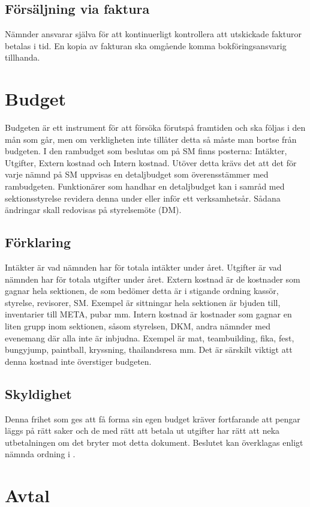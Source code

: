 \documentclass{dgovdoc}
\begin{document}
\subsection{Försäljning via faktura}
Nämnder ansvarar själva för att kontinuerligt kontrollera att utskickade fakturor betalas i tid. En kopia av
fakturan ska omgående komma bokföringsansvarig tillhanda.

\section{Budget}
Budgeten är ett instrument för att försöka förutspå framtiden och ska följas i den mån som går, men om verkligheten inte tillåter detta så måste man bortse från budgeten. I den rambudget som beslutas om på SM finns posterna: Intäkter, Utgifter, Extern kostnad och Intern kostnad. Utöver detta krävs det att det för varje nämnd på SM uppvisas en detaljbudget som överensstämmer med rambudgeten. Funktionärer som handhar en detaljbudget kan i samråd med sektionsstyrelse revidera denna under eller inför ett verksamhetsår. Sådana ändringar skall redovisas på styrelsemöte (DM).

\subsection{Förklaring}
Intäkter är vad nämnden har för totala intäkter under året. Utgifter är vad nämnden har för totala utgifter under året. Extern kostnad är de kostnader som gagnar hela sektionen, de som bedömer detta är i stigande ordning kassör, styrelse, revisorer, SM. Exempel är sittningar hela sektionen är bjuden till, inventarier till META, pubar mm. Intern kostnad är kostnader som gagnar en liten grupp inom sektionen, såsom styrelsen, DKM, andra nämnder med evenemang där alla inte är inbjudna. Exempel är mat, teambuilding, fika, fest, bungyjump, paintball, kryssning, thailandsresa mm. Det är särskilt viktigt att denna kostnad inte överstiger budgeten.

\subsection{Skyldighet}
Denna frihet som ges att få forma sin egen budget kräver fortfarande att pengar läggs på rätt saker och de med rätt att betala ut utgifter har rätt att neka utbetalningen om det bryter mot detta dokument. Beslutet kan överklagas enligt nämnda ordning i .

\section{Avtal}
\end{document}
